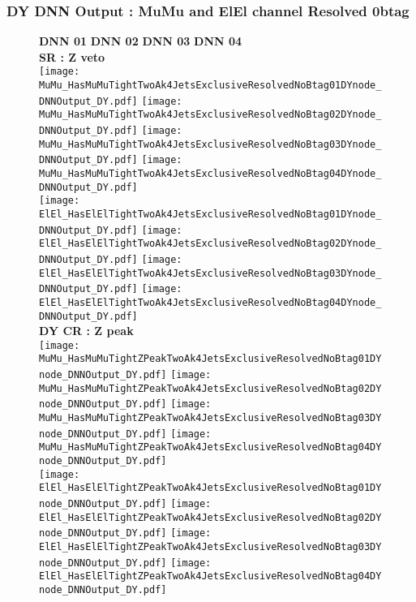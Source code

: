 \documentclass[9pt]{beamer}
\begin{document}

\begin{frame}
	\frametitle{DY DNN Output : MuMu and ElEl channel Resolved 0btag}
	\begin{figure}
	    \textbf{DNN 01} \hspace{1.2cm} \textbf{DNN 02} \hspace{1.2cm} \textbf{DNN 03} \hspace{1.2cm} \textbf{DNN 04} \\
        \centering
        \textbf{SR : Z veto} \\
		\texttt{[image: MuMu\_HasMuMuTightTwoAk4JetsExclusiveResolvedNoBtag01DYnode\_DNNOutput\_DY.pdf]}
		\texttt{[image: MuMu\_HasMuMuTightTwoAk4JetsExclusiveResolvedNoBtag02DYnode\_DNNOutput\_DY.pdf]}
		\texttt{[image: MuMu\_HasMuMuTightTwoAk4JetsExclusiveResolvedNoBtag03DYnode\_DNNOutput\_DY.pdf]}
		\texttt{[image: MuMu\_HasMuMuTightTwoAk4JetsExclusiveResolvedNoBtag04DYnode\_DNNOutput\_DY.pdf]}\\
		\texttt{[image: ElEl\_HasElElTightTwoAk4JetsExclusiveResolvedNoBtag01DYnode\_DNNOutput\_DY.pdf]}
		\texttt{[image: ElEl\_HasElElTightTwoAk4JetsExclusiveResolvedNoBtag02DYnode\_DNNOutput\_DY.pdf]}
		\texttt{[image: ElEl\_HasElElTightTwoAk4JetsExclusiveResolvedNoBtag03DYnode\_DNNOutput\_DY.pdf]}
		\texttt{[image: ElEl\_HasElElTightTwoAk4JetsExclusiveResolvedNoBtag04DYnode\_DNNOutput\_DY.pdf]}\\
        \textbf{DY CR : Z peak} \\
		\texttt{[image: MuMu\_HasMuMuTightZPeakTwoAk4JetsExclusiveResolvedNoBtag01DYnode\_DNNOutput\_DY.pdf]}
		\texttt{[image: MuMu\_HasMuMuTightZPeakTwoAk4JetsExclusiveResolvedNoBtag02DYnode\_DNNOutput\_DY.pdf]}
		\texttt{[image: MuMu\_HasMuMuTightZPeakTwoAk4JetsExclusiveResolvedNoBtag03DYnode\_DNNOutput\_DY.pdf]}
		\texttt{[image: MuMu\_HasMuMuTightZPeakTwoAk4JetsExclusiveResolvedNoBtag04DYnode\_DNNOutput\_DY.pdf]}\\
		\texttt{[image: ElEl\_HasElElTightZPeakTwoAk4JetsExclusiveResolvedNoBtag01DYnode\_DNNOutput\_DY.pdf]}
		\texttt{[image: ElEl\_HasElElTightZPeakTwoAk4JetsExclusiveResolvedNoBtag02DYnode\_DNNOutput\_DY.pdf]}
		\texttt{[image: ElEl\_HasElElTightZPeakTwoAk4JetsExclusiveResolvedNoBtag03DYnode\_DNNOutput\_DY.pdf]}
		\texttt{[image: ElEl\_HasElElTightZPeakTwoAk4JetsExclusiveResolvedNoBtag04DYnode\_DNNOutput\_DY.pdf]}\\
	\end{figure}
\end{frame}
\end{document}
